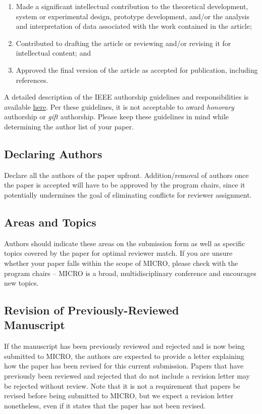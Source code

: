 \documentclass{sig-alternate}
\begin{document}
\begin{enumerate}
\item Made a significant intellectual contribution to the theoretical development, system or experimental design, prototype development, and/or the analysis and interpretation of data associated with the work contained in the article;

\item Contributed to drafting the article or reviewing and/or revising it for intellectual content; and

\item Approved the final version of the article as accepted for publication, including references.
\end{enumerate}

A detailed description of the IEEE authorship guidelines and responsibilities is available \href{https://www.ieee.org/publications_standards/publications/rights/Section821.html}{here}. Per these guidelines, it is not acceptable to award {\em honorary } authorship or {\em gift} authorship. Please keep these guidelines in mind while determining the author list of your paper.

\subsection{Declaring Authors}
Declare all the authors of the paper upfront. Addition/removal of authors once the paper is accepted will have to be approved by the program chairs, since it potentially undermines the goal of eliminating conflicts for reviewer assignment.

\subsection{Areas and Topics}
Authors should indicate these areas on the submission form as well as specific topics covered by the paper for optimal reviewer match. If you are unsure whether your paper falls within the scope of MICRO, please check with the program chairs -- MICRO is a broad, multidisciplinary conference and encourages new topics.

\subsection{Revision of Previously-Reviewed\\ Manuscript}
If the manuscript has been previously reviewed and rejected and is now being submitted to MICRO, the authors are expected to provide a letter explaining how the paper has been revised for this current submission. Papers that have previously been reviewed and rejected that do not include a revision letter may be rejected without review. Note that it is not a requirement that papers be revised before being submitted to MICRO, but we expect a revision letter nonetheless, even if it states that the paper has not been revised.
\end{document}
